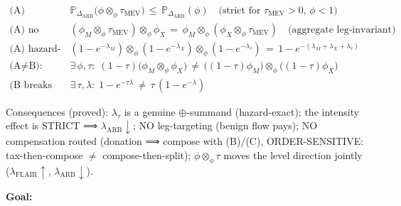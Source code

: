 \documentclass[11pt]{article}
\renewcommand{\_}{\textunderscore\allowbreak}
\begin{document}
\[
    \begin{aligned}
        \text{(A) intensity:} \quad & \mathbb{P}_{\Delta_{\text{ARB}}}\big(\phi \otimes_{\phi} \tau_{\text{MEV}}\big) \, \leq \, \mathbb{P}_{\Delta_{\text{ARB}}}(\phi) \quad \text{(strict for } \tau_{\text{MEV}} > 0,\, \phi < 1\text{)} \\
        \text{(A) no targeting:} \quad & (\phi_M \otimes_{\phi} \tau_{\text{MEV}}) \otimes_{\phi} \phi_X \, = \, \phi_M \otimes_{\phi} (\phi_X \otimes_{\phi} \tau_{\text{MEV}}) \quad \text{(aggregate leg-invariant)} \\
        \text{(A) hazard-exact:} \quad & (1-e^{-\lambda_M}) \otimes_{\phi} (1-e^{-\lambda_X}) \otimes_{\phi} (1-e^{-\lambda_\tau}) \, = \, 1-e^{-(\lambda_M+\lambda_X+\lambda_\tau)} \\
        \text{(A} \neq \text{B):} \quad & \exists\, \phi, \tau:\; (1-\tau)\big(\phi_M \otimes_{\phi} \phi_X\big) \, \neq \, \big((1-\tau)\phi_M\big) \otimes_{\phi} \big((1-\tau)\phi_X\big) \\
        \text{(B breaks hazard):} \quad & \exists\, \tau, \lambda:\; 1-e^{-\tau\lambda} \, \neq \, \tau\,(1-e^{-\lambda})
    \end{aligned}
\]

Consequences (proved): \(\lambda_\tau\) is a genuine \(\oplus\)-summand (hazard-exact); the intensity effect is STRICT ⟹ \(\lambda_{\text{ARB}} \downarrow\); NO leg-targeting (benign flow pays); NO compensation routed (donation ⟹ compose with (B)/(C), ORDER-SENSITIVE: tax-then-compose \(\neq\) compose-then-split); \(\phi \otimes_{\phi} \tau\) moves the level direction jointly (\(\lambda_{\text{FLAIR}} \uparrow\), \(\lambda_{\text{ARB}} \downarrow\)).

\bigskip
\noindent\textbf{Goal:}
\begin{center}
\end{center}
\end{document}

